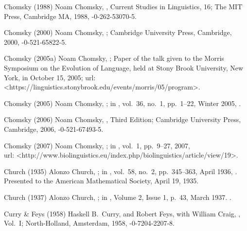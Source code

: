 \biblabel Chomsky (1988)
Noam Chomsky,
,
Current Studies in Linguistics, 16;
The MIT Press, Cambridge MA, 1988,
-0-262-53070-5.

\biblabel Chomsky (2000)
Noam Chomsky,
;
Cambridge University Press, Cambridge, 2000,
-0-521-65822-5.

\biblabel Chomsky (2005a)
Noam Chomsky,
;
Paper of the talk given to the
Morris Symposium on the Evolution of Language,
held at Stony Brook University, New York,
in October 15, 2005;
{\sc url:}
\URL<https://linguistics.stonybrook.edu/events/morris/05/program>.

\biblabel Chomsky (2005)
Noam Chomsky,
;
in ,
vol.\ 36, no.\ 1, pp.\ 1--22, Winter 2005,
.

\biblabel Chomsky (2006)
Noam Chomsky,
, Third Edition;
Cambridge University Press, Cambridge, 2006,
-0-521-67493-5.

\biblabel Chomsky (2007)
Noam Chomsky,
;
in ,
vol.\ 1, pp.\ 9--27, 2007,\\
{\sc url:}
\URL<http://www.biolinguistics.eu/index.php/biolinguistics/article/view/19>.


\biblabel Church (1935)
Alonzo Church,
;
in ,
vol.\ 58, no.\ 2, pp.\ 345--363, April 1936,
.
Presented to the American Mathematical Society,
April 19, 1935.

\biblabel Church (1937)
Alonzo Church,
;
in ,
Volume 2, Issue 1, p.~43, March 1937.
.

\biblabel Curry \& Feys (1958)
Haskell B.\ Curry, and
Robert Feys, with
William  Craig,
, Vol.\ I;
North-Holland, Amsterdam, 1958,
-0-7204-2207-8.


